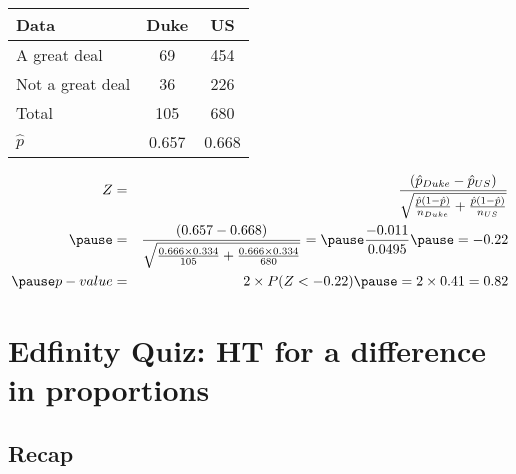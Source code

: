 \documentclass[slidestop,compress,mathserif]{beamer}
\newcommand{\soln}[1]{\textit{#1}}
\begin{document}
\begin{frame}
\frametitle{}


{\footnotesize
\begin{center}
\begin{tabular}{l | c c}
Data			& Duke		& US \\
\hline
A great deal	& 69			& 454 \\
Not a great deal& 36			& 226 \\
\hline
Total			& 105		& 680 \\
\hline
$\hat{p}$		& 0.657		& 0.668
\end{tabular}
\end{center}
}

\pause

\soln{
\begin{eqnarray*}
Z &=& \frac{(\hat{p}_{Duke} - \hat{p}_{US})}{\sqrt{ \frac{ \hat{p} (1 - \hat{p})}{n_{Duke} } + \frac{ \hat{p} (1 -  \hat{p})}{n_{US} } }} \\
\pause 
&=& \frac{(0.657 - 0.668)}{\sqrt{ \frac{0.666 \times 0.334}{105} + \frac{0.666 \times 0.334}{680} }} = \pause \frac{-0.011}{0.0495} \pause = -0.22 \\
\pause
p-value &=& 2 \times P(Z < -0.22) \pause = 2 \times 0.41 = 0.82
\end{eqnarray*}
}

\end{frame}

\section{Edfinity Quiz: HT for a difference in proportions}



\subsection{Recap}

\end{document}
